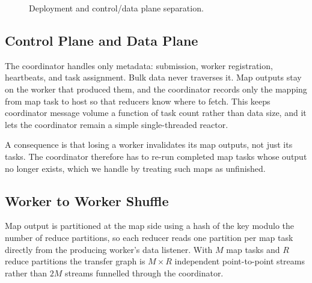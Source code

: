 \documentclass[conference]{IEEEtran}
\begin{document}
\begin{figure}[t]
\centering
{}
\caption{Deployment and control/data plane separation.}
\label{fig:arch}
\end{figure}

\subsection{Control Plane and Data Plane}

The coordinator handles only metadata: submission, worker registration,
heartbeats, and task assignment. Bulk data never traverses it. Map outputs
stay on the worker that produced them, and the coordinator records only the
mapping from map task to host so that reducers know where to fetch. This
keeps coordinator message volume a function of task count rather than data
size, and it lets the coordinator remain a simple single-threaded reactor.

A consequence is that losing a worker invalidates its map outputs, not just
its tasks. The coordinator therefore has to re-run completed map tasks whose
output no longer exists, which we handle by treating such maps as
unfinished.

\subsection{Worker to Worker Shuffle}

Map output is partitioned at the map side using a hash of the key modulo the
number of reduce partitions, so each reducer reads one partition per map
task directly from the producing worker's data listener. With $M$ map tasks
and $R$ reduce partitions the transfer graph is $M \times R$ independent
point-to-point streams rather than $2M$ streams funnelled through the
coordinator.
\end{document}
